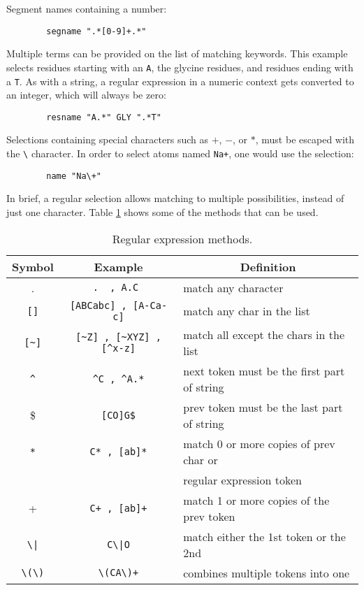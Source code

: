 \noindent Segment names containing a number:

\begin{verbatim}
        segname ".*[0-9]+.*"
\end{verbatim}

\noindent Multiple terms can be provided on the list of
matching keywords.  This example selects residues starting with 
an {\tt A}, the glycine residues, and residues ending with a {\tt T}.  
As with a string, a regular expression in a numeric context gets 
converted to an integer, which will always be zero:

\begin{verbatim}
        resname "A.*" GLY ".*T"
\end{verbatim}


\noindent Selections containing special characters such as $+$, $-$,
or $*$, must be escaped with the \verb$\$ character.  In order to select
atoms named \verb$Na+$, one would use the selection:
   
\begin{verbatim}
        name "Na\+"
\end{verbatim}

In brief, a regular selection allows matching to multiple
possibilities, instead of just one character.  Table
\ref{table:ug:wildcards} shows some of the methods that can be used.

\begin{table}[htb]
\hspace{0.5in}
\begin{tabular}{|c|c|l|} \hline
Symbol      & Example & \multicolumn{1}{|c|}{Definition} \\ 
\hline\hline
.           & \verb!.  , A.C !              & match any character   \\
{\tt []}    & \verb![ABCabc] , [A-Ca-c]!    & match any char in the list  \\
\verb![~]!  & \verb![~Z] , [~XYZ] , [^x-z]! & match all except the chars in the list    \\
\verb!^!    & \verb!^C , ^A.*!              & next token must be the first part of string \\
\$          & \verb![CO]G$!                 & prev token must be the last part of string \\
\verb!*!    & \verb!C* , [ab]*!             & match 0 or more copies of prev char or \\
            &                               & regular expression token \\
+           & \verb!C+ , [ab]+!             & match 1 or more copies of the prev token \\
\verb!\|!   & \verb!C\|O!                   & match either the 1st token or the 2nd \\
\verb!\(\)! & \verb!\(CA\)+!                & combines multiple tokens into one \\ \hline
\end{tabular}
\caption{Regular expression methods.}
\label{table:ug:wildcards}
\end{table}


